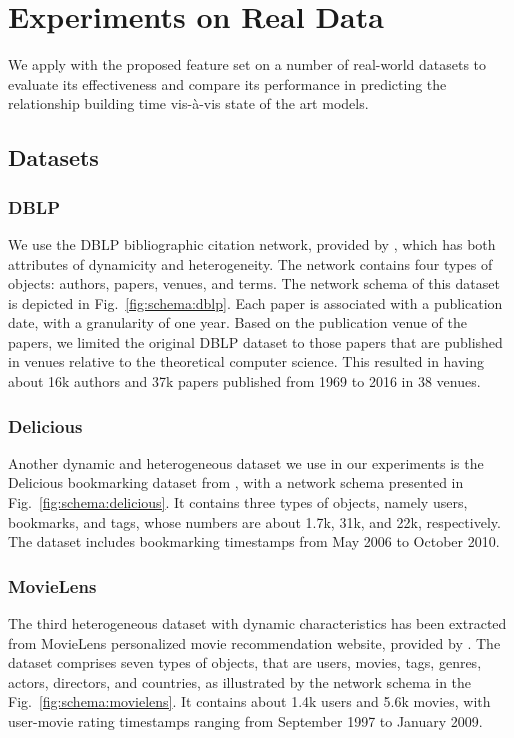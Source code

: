 \section{Experiments on Real Data}\label{sec:results}

We apply \npglm with the proposed feature set on a number of real-world datasets to evaluate its effectiveness and compare its performance in predicting the relationship building time vis-\`a-vis state of the art models. 

\subsection{Datasets}
\subsubsection{DBLP}
We use the DBLP bibliographic citation network, provided by \cite{tang2008aminer}, which has both attributes of dynamicity and heterogeneity. The network contains four types of objects: authors, papers, venues, and terms. The network schema of this dataset is depicted in Fig.~\ref{fig:schema:dblp}. Each paper is associated with a publication date, with a granularity of one year. Based on the publication venue of the papers, we limited the original DBLP dataset to those papers that are published in venues relative to the theoretical computer science. This resulted in having about 16k authors and 37k papers published from 1969 to 2016 in 38 venues. 

\subsubsection{Delicious}
Another dynamic and heterogeneous dataset we use in our experiments is the Delicious bookmarking dataset from \cite{Cantador:RecSys2011}, with a network schema presented in Fig.~\ref{fig:schema:delicious}. It contains three types of objects, namely users, bookmarks, and tags, whose numbers are about 1.7k, 31k, and 22k, respectively. The dataset includes bookmarking timestamps from May 2006 to October 2010.

\subsubsection{MovieLens}
The third heterogeneous dataset with dynamic characteristics has been extracted from MovieLens personalized movie recommendation website, provided by \cite{harper2015}. The dataset comprises seven types of objects, that are users, movies, tags, genres, actors, directors, and countries, as illustrated by the network schema in the Fig.~\ref{fig:schema:movielens}. It contains about 1.4k users and 5.6k movies, with user-movie rating timestamps ranging from September 1997 to January 2009.

